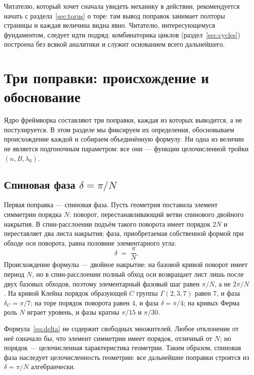 Читателю, который хочет сначала увидеть механику в действии,
рекомендуется начать с раздела~\ref{sec:torus} о торе: там вывод
поправок занимает полторы страницы и каждая величина видна явно.
Читателю, интересующемуся фундаментом, следует идти подряд: комбинаторика
циклов (раздел~\ref{sec:cycles}) построена без всякой аналитики и
служит основанием всего дальнейшего.

\section{Три поправки: происхождение и обоснование}\label{sec:corrections}

Ядро фреймворка составляют три поправки, каждая из которых выводится,
а не постулируется. В этом разделе мы фиксируем их определения,
обосновываем происхождение каждой и собираем объединённую формулу.
Ни одна из величин не является подгоночным параметром: все они —
функции целочисленной тройки $(n,B,\lambda_0)$.

\subsection{Спиновая фаза $\delta=\pi/N$}

Первая поправка — спиновая фаза. Пусть геометрия поставила элемент
симметрии порядка $N$: поворот, перестанавливающий ветви спинового
двойного накрытия. В спин-расслоении подъём такого поворота имеет
порядок $2N$ и переставляет два листа накрытия; фаза, приобретаемая
собственной формой при обходе оси поворота, равна половине элементарного
угла:
\begin{equation}\label{eq:delta}
  \delta \;=\; \frac{\pi}{N}.
\end{equation}
Происхождение формулы — двойное накрытие: на базовой кривой поворот
имеет период $N$, но в спин-расслоении полный обход оси возвращает
лист лишь после двух базовых обходов, поэтому элементарный фазовый шаг
равен $\pi/N$, а не $2\pi/N$. На кривой Клейна порядок образующей
$C$ группы $\Gamma(2,3,7)$ равен $7$, и фаза $\delta_C=\pi/7$; на торе
порядок поворота равен $4$, и фаза $\delta=\pi/4$; на кривых Ферма
роль $N$ играет уровень, и фазы кратны $\pi/15$ и $\pi/30$.

\begin{remark}
Формула~\eqref{eq:delta} не содержит свободных множителей. Любое
отклонение от неё означало бы, что элемент симметрии имеет порядок,
отличный от $N$; но порядок — целочисленная характеристика геометрии.
Таким образом, спиновая фаза наследует целочисленность геометрии:
все дальнейшие поправки строятся из $\delta=\pi/N$ алгебраически.
\end{remark}

